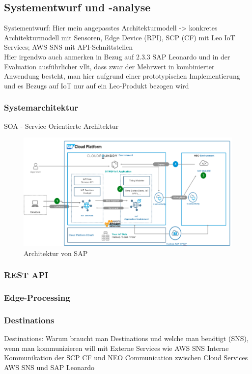 \subsection{Systementwurf und -analyse}
Systementwurf: Hier mein angepasstes Architekturmodell -> konkretes Architekturmodell mit Sensoren, Edge Device (RPI), SCP (CF) mit Leo IoT Services; AWS SNS mit API-Schnittstellen
\\Hier irgendwo auch anmerken in Bezug auf 2.3.3 SAP Leonardo und in der Evaluation ausführlicher vllt, dass zwar der Mehrwert in kombinierter Anwendung besteht, man hier aufgrund einer prototypischen Implementierung und es Bezugs auf IoT nur auf ein Leo-Produkt bezogen wird

\subsubsection{Systemarchitektur}

SOA - Service Orientierte Architektur
\begin{figure}[H]
    \centering
    \includegraphics[width=1.0\linewidth]{pictures/sap_architecture}
    \caption[Referenzarchitektur von SAP]{Architektur von SAP \citep{Ganz2019}}
    \label{fig:filename_without_extension}
\end{figure}


\subsubsection{REST API}

\subsubsection{Edge-Processing}

\subsubsection{Destinations}
Destinations: Warum braucht man Destinations und welche man benötigt (SNS),  wenn man kommunizieren will mit
Externe Services wie AWS SNS
Interne Kommunikation der SCP CF und NEO
Communication zwischen Cloud Services AWS SNS und SAP Leonardo

